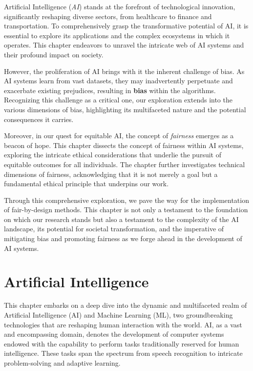 \documentclass[12pt,a4paper,openright,twoside]{book}
\begin{document}
Artificial Intelligence (\emph{AI}) stands at the forefront of technological innovation, significantly reshaping diverse sectors, from healthcare to finance and transportation. To comprehensively grasp the transformative potential of AI, it is essential to explore its applications and the complex ecosystems in which it operates. This chapter endeavors to unravel the intricate web of AI systems and their profound impact on society.

However, the proliferation of AI brings with it the inherent challenge of bias. As AI systems learn from vast datasets, they may inadvertently perpetuate and exacerbate existing prejudices, resulting in \textbf{bias} within the algorithms. Recognizing this challenge as a critical one, our exploration extends into the various dimensions of bias, highlighting its multifaceted nature and the potential consequences it carries. 

Moreover, in our quest for equitable AI, the concept of \emph{fairness} emerges as a beacon of hope. This chapter dissects the concept of fairness within AI systems, exploring the intricate ethical considerations that underlie the pursuit of equitable outcomes for all individuals. The chapter further investigates technical dimensions of fairness, acknowledging that it is not merely a goal but a fundamental ethical principle that underpins our work. 

Through this comprehensive exploration, we pave the way for the implementation of fair-by-design methods. This chapter is not only a testament to the foundation on which our research stands but also a testament to the complexity of the AI landscape, its potential for societal transformation, and the imperative of mitigating bias and promoting fairness as we forge ahead in the development of AI systems. 


\section{Artificial Intelligence}

This chapter embarks on a deep dive into the dynamic and multifaceted realm of Artificial Intelligence (AI) and Machine Learning (ML), two groundbreaking technologies that are reshaping human interaction with the world. AI, as a vast and encompassing domain, denotes the development of computer systems endowed with the capability to perform tasks traditionally reserved for human intelligence. These tasks span the spectrum from speech recognition to intricate problem-solving and adaptive learning. 
\end{document}
